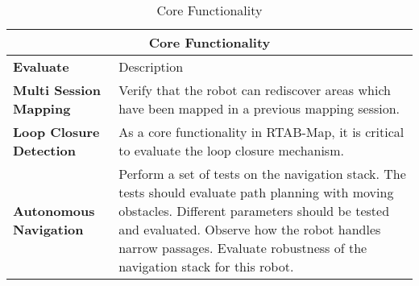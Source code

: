 \begin{table}
	\centering
	\begin{tabular}{ p{2.5cm} | p{7cm} }
	\multicolumn{2}{c}{Core Functionality}\\
\hline
	\textbf{Evaluate} & Description\\
	\hline
	\textbf{Multi Session Mapping} & Verify that the robot can rediscover areas which have been mapped in a previous mapping session.\\
	\hline
	\textbf{Loop Closure Detection} & As a core functionality in \ac{RTAB-Map}, it is critical to evaluate the loop closure mechanism.\\
	\hline
	\textbf{Autonomous Navigation} & Perform a set of tests on the navigation stack. The tests should evaluate path planning with moving obstacles. Different parameters should be tested and evaluated. Observe how the robot handles narrow passages. Evaluate robustness of the navigation stack for this robot.\\
	\hline
	\end{tabular}
	\caption{Core Functionality}\label{tab:main_func}
\end{table}


